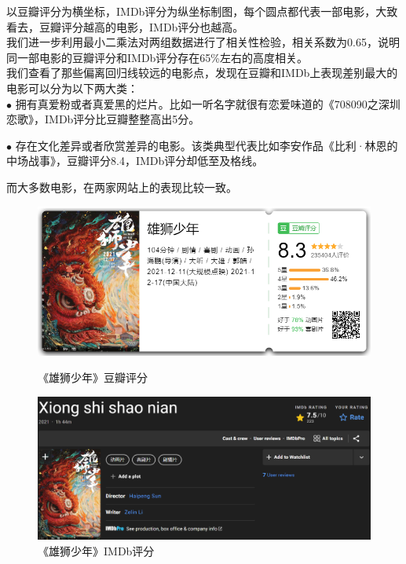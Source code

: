 \documentclass[12pt,a4paper,utf8]{article}
\begin{document}
以豆瓣评分为横坐标，IMDb评分为纵坐标制图，每个圆点都代表一部电影，大致看去，豆瓣评分越高的电影，IMDb评分也越高。\\

我们进一步利用最小二乘法对两组数据进行了相关性检验，相关系数为0.65，说明同一部电影的豆瓣评分和IMDb评分存在65\%左右的高度相关。\\

我们查看了那些偏离回归线较远的电影点，发现在豆瓣和IMDb上表现差别最大的电影可以分为以下两大类：\\

$\bullet$ 拥有真爱粉或者真爱黑的烂片。比如一听名字就很有恋爱味道的《708090之深圳恋歌》，IMDb评分比豆瓣整整高出5分。

$\bullet$ 存在文化差异或者欣赏差异的电影。该类典型代表比如李安作品《比利·林恩的中场战事》，豆瓣评分8.4，IMDb评分却低至及格线。

而大多数电影，在两家网站上的表现比较一致。\\

\begin{figure}[H]  
\centering
 \begin{minipage}[t]{0.45\textwidth} 
  \includegraphics[scale = 0.25]{images/雄狮少年.png}
  \caption{《雄狮少年》豆瓣评分}
 \end{minipage}
 \begin{minipage}[t]{0.45\textwidth} 
  \includegraphics[scale = 0.15]{images/idmb-xssn.png}
  \caption{《雄狮少年》IMDb评分}
 \end{minipage}  
\end{figure}
\end{document}
